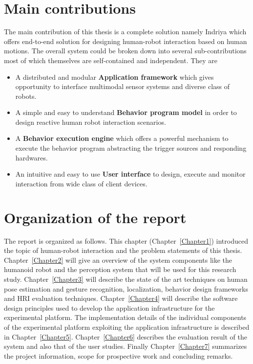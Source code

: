 \section{Main contributions}
\label{sec:contributions}

The main contribution of this thesis is a complete solution namely Indriya which offers end-to-end solution for designing human-robot interaction based on human motions. The overall system could be broken down into several sub-contributions most of which themselves are self-contained and independent. They are

\begin{itemize}
\item A distributed and modular \textbf{Application framework} which gives opportunity to interface multimodal sensor systems and diverse class of robots.
\item A simple and easy to understand \textbf{Behavior program model} in order to design reactive human robot interaction scenarios.
\item A \textbf{Behavior execution engine} which offers a powerful mechanism to execute the behavior program abstracting the trigger sources and responding hardwares.
\item An intuitive and easy to use \textbf{User interface} to design, execute and monitor interaction from wide class of client devices.
\end{itemize}

\section{Organization of the report}
\label{sec:organization}
The report is organized as follows. This chapter (Chapter~\ref{Chapter1}) introduced the topic of human-robot interaction and the problem statements of this thesis. Chapter~\ref{Chapter2} will give an overview of the system components like the humanoid robot and the perception system that will be used for this research study. Chapter~\ref{Chapter3} will describe the state of the art techniques on human pose estimation and gesture recognition, localization, behavior design frameworks and HRI evaluation techniques. Chapter~\ref{Chapter4} will describe the software design principles used to develop the application infrastructure for the experimental platform. The implementation details of the individual components of the experimental platform exploiting the application infrastructure is described in Chapter~\ref{Chapter5}. Chapter~\ref{Chapter6} describes the evaluation result of the system and also that of the user studies. Finally Chapter~\ref{Chapter7} summarizes the project information, scope for prospective work and concluding remarks.
